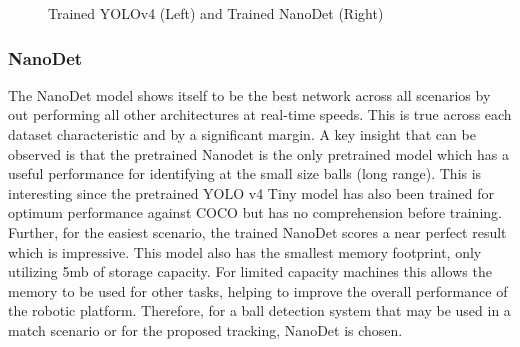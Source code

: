 \documentclass[a4paper,twoside,12pt]{report}
\begin{document}
\begin{figure}[h!]
    \centering
    \qquad
    \caption{Trained YOLOv4 (Left) and Trained NanoDet (Right)}
\end{figure}

\subsubsection{NanoDet}

The NanoDet model shows itself to be the best network across all scenarios by out performing all other architectures at real-time speeds. This is true across each dataset characteristic and by a significant margin. A key insight that can be observed is that the pretrained Nanodet is the only pretrained model which has a useful performance for identifying at the small size balls (long range). This is interesting since the pretrained YOLO v4 Tiny model has also been trained for optimum performance against COCO but has no comprehension before training. Further, for the easiest scenario, the trained NanoDet scores a near perfect result which is impressive. This model also has the smallest memory footprint, only utilizing 5mb of storage capacity. For limited capacity machines this allows the memory to be used for other tasks, helping to improve the overall performance of the robotic platform. Therefore, for a ball detection system that may be used in a match scenario or for the proposed tracking, NanoDet is chosen.
\end{document}
